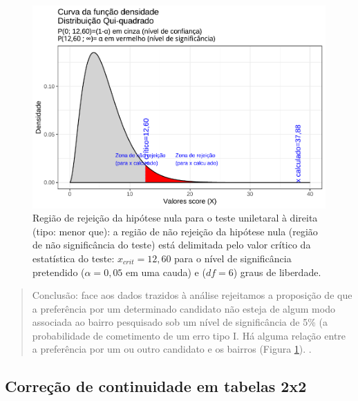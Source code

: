 \documentclass[
]{book}
\begin{document}
\begin{figure}

{\centering \includegraphics[width=1\linewidth]{apostila_files/figure-latex/fig96-1} 

}

\caption{Região de rejeição da hipótese nula para o teste uniletaral à direita (tipo: menor que): a região de não rejeição da hipótese nula (região de não significância do teste) está delimitada pelo valor crítico da estatística do teste: $x_{crit}=12,60$ para o nível de significância pretendido ($\alpha=0,05$ em uma cauda)  e ($df=6$) graus de liberdade.}\label{fig:fig96}
\end{figure}

\hfill\break

\begin{quote}
Conclusão: face aos dados trazidos à análise rejeitamos a proposição de que a preferência por um determinado candidato não esteja de algum modo associada ao bairro pesquisado sob um nível de significância de 5\% (a probabilidade de cometimento de um erro tipo I. Há alguma relação entre a preferência por um ou outro candidato e os bairros (Figura \ref{fig:fig96}).
.
\end{quote}

\hfill\break

\hypertarget{correuxe7uxe3o-de-continuidade-em-tabelas-2x2}{%
\subsection{Correção de continuidade em tabelas 2x2}\label{correuxe7uxe3o-de-continuidade-em-tabelas-2x2}}

\hfill\break
\end{document}
